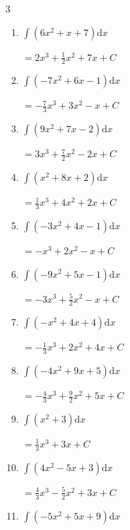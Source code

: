 \begin{multicols}{3}
\begin{enumerate}
\columnbreak %

  \item $\displaystyle \int \left( 6x^{2}+x+7 \right) \mathrm{d}x$

        $\displaystyle =2x^{3}+\frac{1}{2}x^{2}+7x+ C$

  \item $\displaystyle \int \left( -7x^{2}+6x-1 \right) \mathrm{d}x$

        $\displaystyle =-\frac{7}{3}x^{3}+3x^{2}-x+ C$

  \item $\displaystyle \int \left( 9x^{2}+7x-2 \right) \mathrm{d}x$

        $\displaystyle =3x^{3}+\frac{7}{2}x^{2}-2x+ C$

  \item $\displaystyle \int \left( x^{2}+8x+2 \right) \mathrm{d}x$

        $\displaystyle =\frac{1}{3}x^{3}+4x^{2}+2x+ C$

  \item $\displaystyle \int \left( -3x^{2}+4x-1 \right) \mathrm{d}x$

        $\displaystyle =-x^{3}+2x^{2}-x+ C$

  \item $\displaystyle \int \left( -9x^{2}+5x-1 \right) \mathrm{d}x$

        $\displaystyle =-3x^{3}+\frac{5}{2}x^{2}-x+ C$

  \item $\displaystyle \int \left( -x^{2}+4x+4 \right) \mathrm{d}x$

        $\displaystyle =-\frac{1}{3}x^{3}+2x^{2}+4x+ C$

  \item $\displaystyle \int \left( -4x^{2}+9x+5 \right) \mathrm{d}x$

        $\displaystyle =-\frac{4}{3}x^{3}+\frac{9}{2}x^{2}+5x+ C$

  \item $\displaystyle \int \left( x^{2}+3 \right) \mathrm{d}x$

        $\displaystyle =\frac{1}{3}x^{3}+3x+ C$

  \item $\displaystyle \int \left( 4x^{2}-5x+3 \right) \mathrm{d}x$

        $\displaystyle =\frac{4}{3}x^{3}-\frac{5}{2}x^{2}+3x+ C$

\columnbreak %

  \item $\displaystyle \int \left( -5x^{2}+5x+9 \right) \mathrm{d}x$


\end{enumerate}
\end{multicols}
